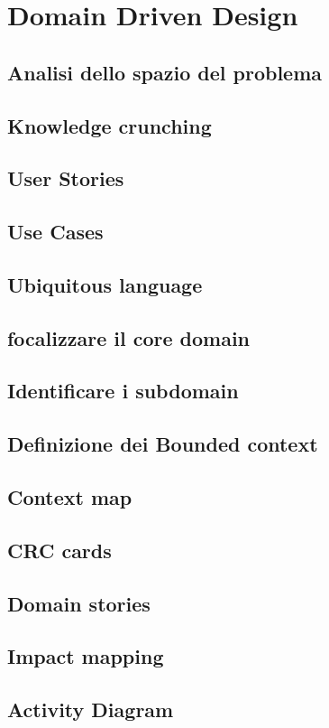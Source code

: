 \chapter{Domain Driven Design}

	\section{Analisi dello spazio del problema}

	\section{Knowledge crunching}
	
	\section{User Stories}
            
	\section{Use Cases}
  
	\section{Ubiquitous language}
	
	\section{focalizzare il core domain}
	
	\section{Identificare i subdomain}
	
	\section{Definizione dei Bounded 
	context}
	
	\section{Context map}
	
	\section{CRC cards}
	
	\section{Domain stories}
	
	\section{Impact mapping}
	
	\section{Activity Diagram}

